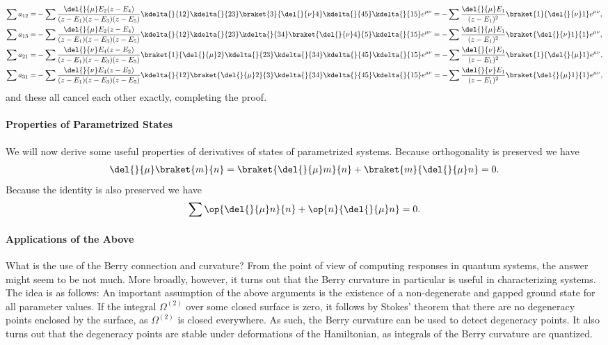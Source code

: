 \begin{align*}
	\sum a_{12} =& -\sum\frac{\del{}{\mu}E_{2}(z - E_{4})}{(z - E_{1})(z - E_{3})(z - E_{5})}\kdelta{}{12}\kdelta{}{23}\braket{3}{\del{}{\nu}4}\kdelta{}{45}\kdelta{}{15}e^{\mu\nu} = -\sum\frac{\del{}{\mu}E_{1}}{(z - E_{1})^{2}}\braket{1}{\del{}{\nu}1}e^{\mu\nu}, \\
	\sum a_{13} =& -\sum\frac{\del{}{\mu}E_{2}(z - E_{4})}{(z - E_{1})(z - E_{3})(z - E_{5})}\kdelta{}{12}\kdelta{}{23}\kdelta{}{34}\braket{\del{}{\nu}4}{5}\kdelta{}{15}e^{\mu\nu} = -\sum\frac{\del{}{\mu}E_{1}}{(z - E_{1})^{2}}\braket{\del{}{\nu}1}{1}e^{\mu\nu}, \\
	\sum a_{21} =& -\sum\frac{\del{}{\nu}E_{4}(z - E_{2})}{(z - E_{1})(z - E_{3})(z - E_{5})}\braket{1}{\del{}{\mu}2}\kdelta{}{23}\kdelta{}{34}\kdelta{}{45}\kdelta{}{15}e^{\mu\nu} = -\sum\frac{\del{}{\nu}E_{1}}{(z - E_{1})^{2}}\braket{1}{\del{}{\mu}1}e^{\mu\nu}, \\
	\sum a_{31} =& -\sum\frac{\del{}{\nu}E_{4}(z - E_{2})}{(z - E_{1})(z - E_{3})(z - E_{5})}\kdelta{}{12}\braket{\del{}{\mu}2}{3}\kdelta{}{34}\kdelta{}{45}\kdelta{}{15}e^{\mu\nu} = -\sum\frac{\del{}{\nu}E_{1}}{(z - E_{1})^{2}}\braket{\del{}{\mu}1}{1}e^{\mu\nu},
\end{align*}
and these all cancel each other exactly, completing the proof.

\paragraph{Properties of Parametrized States}
We will now derive some useful properties of derivatives of states of parametrized systems. Because orthogonality is preserved we have
\begin{align*}
	\del{}{\mu}\braket{m}{n} = \braket{\del{}{\mu}m}{n} + \braket{m}{\del{}{\mu}n} = 0.
\end{align*}
Because the identity is also preserved we have
\begin{align*}
	\sum\op{\del{}{\mu}n}{n} + \op{n}{\del{}{\mu}n} = 0.
\end{align*}

\paragraph{Applications of the Above}
What is the use of the Berry connection and curvature? From the point of view of computing responses in quantum systems, the answer might seem to be not much. More broadly, however, it turns out that the Berry curvature in particular is useful in characterizing systems. The idea is as follows: An important assumption of the above arguments is the existence of a non-degenerate and gapped ground state for all parameter values. If the integral $\Omega^{(2)}$ over some closed surface is zero, it follows by Stokes' theorem that there are no degeneracy points enclosed by the surface, as $\Omega^{(2)}$ is closed everywhere. As such, the Berry curvature can be used to detect degeneracy points. It also turns out that the degeneracy points are stable under deformations of the Hamiltonian, as integrals of the Berry curvature are quantized.

